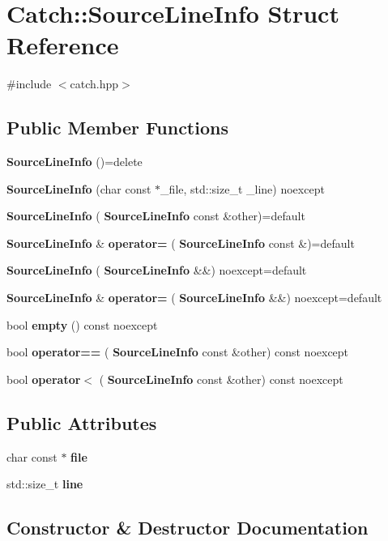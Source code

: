 \section{Catch\+::Source\+Line\+Info Struct Reference}
\label{struct_catch_1_1_source_line_info}


{\ttfamily \#include $<$catch.\+hpp$>$}

\subsection*{Public Member Functions}
\begin{DoxyCompactItemize}
\item 
\textbf{ Source\+Line\+Info} ()=delete
\item 
\textbf{ Source\+Line\+Info} (char const $\ast$\+\_\+file, std\+::size\+\_\+t \+\_\+line) noexcept
\item 
\textbf{ Source\+Line\+Info} (\textbf{ Source\+Line\+Info} const \&other)=default
\item 
\textbf{ Source\+Line\+Info} \& \textbf{ operator=} (\textbf{ Source\+Line\+Info} const \&)=default
\item 
\textbf{ Source\+Line\+Info} (\textbf{ Source\+Line\+Info} \&\&) noexcept=default
\item 
\textbf{ Source\+Line\+Info} \& \textbf{ operator=} (\textbf{ Source\+Line\+Info} \&\&) noexcept=default
\item 
bool \textbf{ empty} () const noexcept
\item 
bool \textbf{ operator==} (\textbf{ Source\+Line\+Info} const \&other) const noexcept
\item 
bool \textbf{ operator$<$} (\textbf{ Source\+Line\+Info} const \&other) const noexcept
\end{DoxyCompactItemize}
\subsection*{Public Attributes}
\begin{DoxyCompactItemize}
\item 
char const  $\ast$ \textbf{ file}
\item 
std\+::size\+\_\+t \textbf{ line}
\end{DoxyCompactItemize}


\subsection{Constructor \& Destructor Documentation}
\mbox{\label{struct_catch_1_1_source_line_info_a2d80932bb4129b1606d1924a5c44be2f}} 
